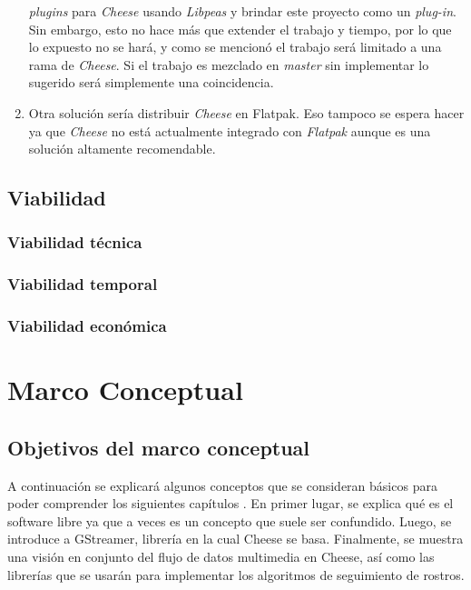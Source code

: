 \documentclass[a4paper,openright,12pt]{report}
\begin{document}
\begin{enumerate}
        \textit{plugins} para \textit{Cheese} usando \textit{Libpeas} y brindar
        este proyecto como un \textit{plug-in}. Sin
        embargo, esto no hace más que extender el trabajo y tiempo, por lo que
        lo expuesto no se hará, y como se mencionó el trabajo será limitado
        a una rama de \textit{Cheese}. Si el trabajo es mezclado en
        \textit{master} sin implementar lo sugerido será simplemente una
        coincidencia.
    \item Otra solución sería distribuir \textit{Cheese} en Flatpak. Eso tampoco
        se espera hacer ya que \textit{Cheese} no está actualmente integrado con
        \textit{Flatpak} aunque es una solución altamente recomendable.
\end{enumerate}


\section{Viabilidad}
\subsection{Viabilidad técnica}
\subsection{Viabilidad temporal}
\subsection{Viabilidad económica}
\chapter{Marco Conceptual}
\section{Objetivos del marco conceptual}
A continuación se explicará algunos conceptos que se consideran básicos para
poder comprender los siguientes capítulos \cite{shaik2007robust}. En primer lugar, se explica qué es
el software libre ya que a veces es un concepto que suele ser confundido. Luego,
se introduce a GStreamer, librería en la cual Cheese se basa. Finalmente, se
muestra una visión en conjunto del flujo de datos multimedia en Cheese, así como
las librerías que se usarán para implementar los algoritmos de seguimiento de
rostros.
\end{document}

